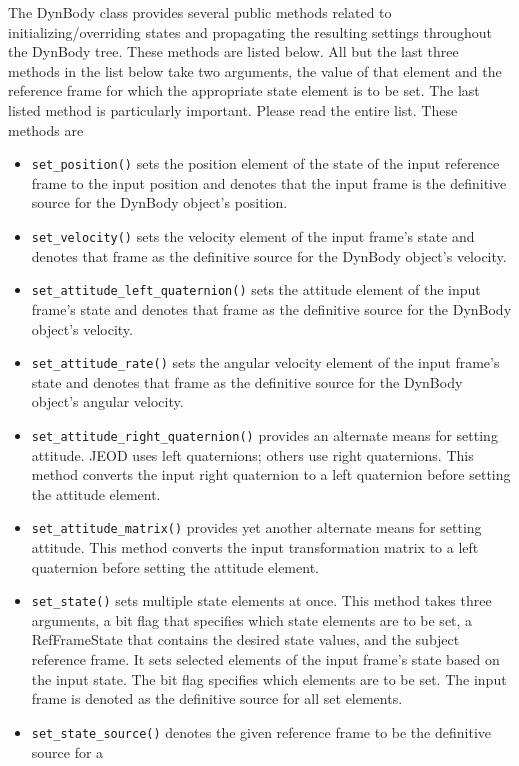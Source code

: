 The DynBody class provides several public methods related to
initializing/overriding states and propagating the resulting settings
throughout the DynBody tree. These methods are listed below.
All but the last three methods in the list below take two arguments,
the value of that element and the reference frame for which the appropriate
state element is to be set. The last listed method is particularly
important. Please read the entire list. These methods are
\begin{itemize}
\item \verb+set_position()+
  sets the position element of the state of the input reference frame
  to the input position and denotes that the input frame is
  the definitive source for the DynBody object's position.
\item \verb+set_velocity()+
  sets the velocity element of the input frame's state and denotes that frame as
  the definitive source for the DynBody object's velocity.
\item \verb+set_attitude_left_quaternion()+
  sets the attitude element of the input frame's state and denotes that frame as
  the definitive source for the DynBody object's velocity.
\item \verb+set_attitude_rate()+
  sets the angular velocity element of the input frame's state and denotes that
  frame as the definitive source for the DynBody object's angular velocity.
\item \verb+set_attitude_right_quaternion()+
  provides an alternate means for setting attitude.
  JEOD uses left quaternions; others use right quaternions.
  This method converts the input right quaternion to a left quaternion
  before setting the attitude element.
\item \verb+set_attitude_matrix()+
  provides yet another alternate means for setting attitude.
  This method converts the input transformation matrix to a left quaternion
  before setting the attitude element.
\item \verb+set_state()+
  sets multiple state elements at once. This method takes three arguments,
  a bit flag that specifies which state elements are to be set,
  a RefFrameState that contains the desired state values,
  and the subject reference frame.
  It sets selected elements of the input frame's state based on the input state.
  The bit flag specifies which elements are to be set.
  The input frame is denoted as the definitive source for all set elements.
\item \verb+set_state_source()+
  denotes the given reference frame to be the definitive source for a

\end{itemize}
